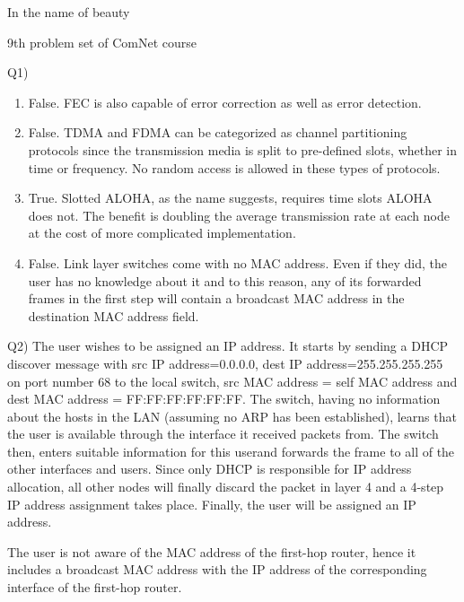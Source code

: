 \documentclass[10pt,letterpaper]{article}
\begin{document}
\Large
\begin{center}
In the name of beauty

9th problem set of ComNet course

\hrulefill
\end{center}
Q1)
\begin{enumerate}[label=\alph*-]
\item
False. FEC is also capable of error correction as well as error detection.
\item
False. TDMA and FDMA can be categorized as channel partitioning protocols since the transmission media is split to pre-defined slots, whether in time or frequency. No random access is allowed in these types of protocols.
\item
True. Slotted ALOHA, as the name suggests, requires time slots ALOHA does not. The benefit is doubling the average transmission rate at each node at the cost of more complicated implementation.
\item
False. Link layer switches come with no MAC address. Even if they did, the user has no knowledge about it and to this reason, any of its forwarded frames in the first step will contain a broadcast MAC address in the destination MAC address field.
\end{enumerate}

Q2) The user wishes to be assigned an IP address. It starts by sending a DHCP discover message with src IP address=0.0.0.0, dest IP address=255.255.255.255 on port number 68 to the local switch, src MAC address = self MAC address and dest MAC address = FF:FF:FF:FF:FF:FF. The switch, having no information about the hosts in the LAN (assuming no ARP has been established), learns that the user is available through the interface it received packets from. The switch then, enters suitable information for this userand forwards the frame to all of the other interfaces and users. Since only DHCP is responsible for IP address allocation, all other nodes will finally discard the packet in layer 4 and a 4-step IP address assignment takes place. Finally, the user will be assigned an IP address.

The user is not aware of the MAC address of the first-hop router, hence it includes a broadcast MAC address with the IP address of the corresponding interface of the first-hop router.
\end{document}
